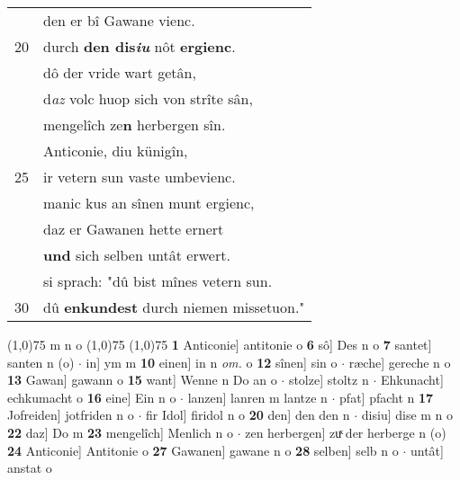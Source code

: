 \documentclass[8pt,a4paper,notitlepage]{article}
\begin{document}
\begin{table}[ht]
\begin{minipage}[t]{0.5\linewidth}
\begin{tabular}{rl}
 & den er bî Gawane vienc.\\ 
20 & durch \textbf{den dis\textit{iu}} nôt \textbf{ergienc}.\\ 
 & dô der vride wart getân,\\ 
 & d\textit{az} volc huop sich von strîte sân,\\ 
 & mengelîch ze\textbf{n} herbergen sîn.\\ 
 & Anticonie, diu künigîn,\\ 
25 & ir vetern sun vaste umbevienc.\\ 
 & manic kus an sînen munt ergienc,\\ 
 & daz er Gawanen hette ernert\\ 
 & \textbf{und} sich selben untât erwert.\\ 
 & si sprach: "dû bist mînes vetern sun.\\ 
30 & dû \textbf{en}\textbf{kundest} durch niemen missetuon."\\ 
\end{tabular}
\scriptsize
\line(1,0){75} \newline
m n o \newline
\line(1,0){75} \newline
\newline
\line(1,0){75} \newline
\textbf{1} Anticonie] antitonie o \textbf{6} sô] Des n o \textbf{7} santet] santen n (o)  $\cdot$ in] ym m \textbf{10} einen] in n \textit{om.} o \textbf{12} sînen] sin o  $\cdot$ ræche] gereche n o \textbf{13} Gawan] gawann o \textbf{15} want] Wenne n Do an o  $\cdot$ stolze] stoltz n  $\cdot$ Ehkunacht] echkumacht o \textbf{16} eine] Ein n o  $\cdot$ lanzen] lanren m lantze n  $\cdot$ pfat] pfacht n \textbf{17} Jofreiden] jotfriden n o  $\cdot$ fir Idol] firidol n o \textbf{20} den] den den n  $\cdot$ disiu] dise m n o \textbf{22} daz] Do m \textbf{23} mengelîch] Menlich n o  $\cdot$ zen herbergen] zuͯ der herberge n (o) \textbf{24} Anticonie] Antitonie o \textbf{27} Gawanen] gawane n o \textbf{28} selben] selb n o  $\cdot$ untât] anstat o \newline
\end{minipage}
\end{table}
\newpage
\end{document}
